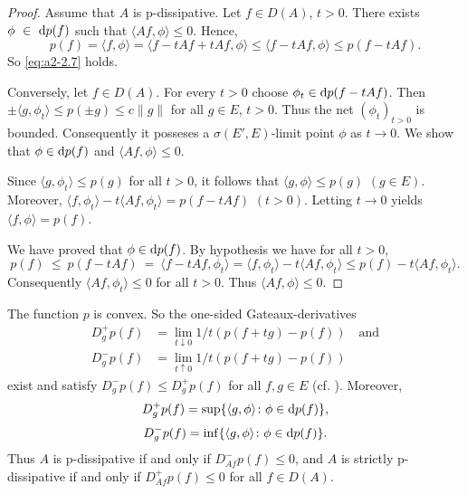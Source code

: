 \begin{proof}
Assume that $A$ is p-dissipative.
Let $f \in D(A)$,  $t > 0$.
There exists  $\phi~\in~\mathop{}\!\mathrm{d}{p}(f)$ such that $\langle Af,\phi \rangle \leq 0$.
Hence, 
\[
p(f) = \langle f,\phi \rangle = \langle f - tAf + tAf, \phi \rangle \leq \langle f - tAf,\phi \rangle \leq p(f - tAf).
\] 
So \eqref{eq:a2-2.7} holds.

Conversely, let $f \in D(A)$.
For every $t > 0$ choose $\phi_{t} \in \mathop{}\!\mathrm{d}{p}(f - tAf)$.
Then $\pm\langle g,\phi_{t} \rangle \leq p(\pm g) \leq c\|g\|$ for all $g \in E$, $t > 0$.
Thus the net $(\phi_{t})_{t>0}$ is bounded.
Consequently it posseses a $\sigma(E',E)$-limit point $\phi$ as $t \to 0$.
We show that $\phi \in \mathop{}\!\mathrm{d}{p}(f)$ and $\langle Af,\phi \rangle \leq 0$.

Since $\langle g,\phi_{t} \rangle \leq p(g)$ for all $t > 0$, it follows that $\langle g,\phi \rangle \leq p(g)$ $(g \in E)$.
Moreover, $\langle f,\phi_{t} \rangle - t\langle Af, \phi_{t} \rangle = p(f - tAf)$ $(t > 0)$.
Letting $t \to 0$ yields $\langle f,\phi \rangle = p(f)$.

We have proved that $\phi \in \mathop{}\!\mathrm{d}{p}(f)$.
By hypothesis we have for all $t > 0$, \\
%
\[
	p(f)~\leq~p(f-tAf)~=~\langle f-tAf,\phi_{t} \rangle 
= \langle f,\phi_{t} \rangle - t\langle Af,\phi_{t} \rangle \leq p(f) - t\langle Af,\phi_{t} \rangle .
\]
%
Consequently $\langle Af,\phi_{t} \rangle \leq 0$ for all $t > 0$.
Thus $\langle Af,\phi \rangle \leq 0$.
\end{proof}
\begin{remark}\label{rem:a2-2.4}
The function $p$ is convex.
So the one-sided Gateaux-derivatives
\begin{align*}
D^{+}_{g} p(f) &= \lim_{t \downarrow 0} 1/t (p(f+tg) - p(f)) \quad \text{and} \\
D^{-}_{g} p(f) &= \lim_{t \uparrow 0} 1/t (p(f+tg) - p(f))
\end{align*}
exist and satisfy $D^{-}_{g}p(f) \leq D^{+}_{g}p(f)$ for all $f, g \in E$ (cf. \citet{moreau:1966}).
Moreover,
\begin{equation}\label{eq:a2-2.9}
D^{+}_{g} p(f) = \sup \{\langle g,\phi \rangle \colon \phi \in \mathop{}\!\mathrm{d}{p}(f)\},
\end{equation}
\begin{equation}\label{eq:a2-2.10}
D^{-}_{g} p(f) = \inf \{\langle g,\phi \rangle \colon \phi \in \mathop{}\!\mathrm{d}{p}(f)\}.
\end{equation}
Thus $A$ is p-dissipative if and only if $D^{-}_{Af} p(f) \leq 0$, and $A$ is strictly p-dissipative if and only if $D^{+}_{Af} p(f) \leq 0$ for all $f \in D(A)$.
\end{remark}
